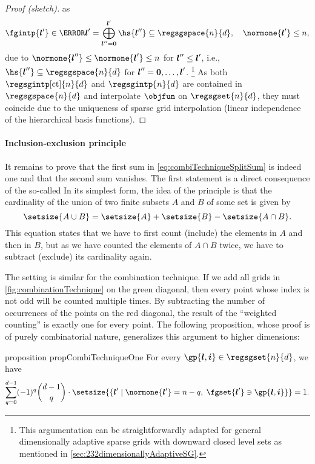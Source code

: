 \begin{proof}[Proof (sketch)]
  as
  \begin{equation}
    \fgintp{\*l'} \in
    \ns{\*l'}
    = \bigoplus_{\*l''=\*0}^{\*l'} \hs{\*l''}
    \subset \regsgspace{n}{d},\quad
    \normone{\*l'} \le n,
  \end{equation}
  due to $\normone{\*l''} \le \normone{\*l'} \le n$
  for ${\boldsymbol{l}}'' \le {\boldsymbol{l}}'$, i.e.,
  $\hs{\*l''} \subset \regsgspace{n}{d}$ for
  ${\boldsymbol{l}}'' = {\boldsymbol{0}}, \dotsc, {\boldsymbol{l}}'$.%
  \footnote{%
    This argumentation can be straightforwardly adapted
    for general dimensionally adaptive sparse grids
    with downward closed level sets as mentioned in
    \cref{sec:232dimensionallyAdaptiveSG}.%
  }
  As both $\regsgintp[\ct]{n}{d}$ and $\regsgintp{n}{d}$
  are contained in $\regsgspace{n}{d}$ and
  interpolate $\objfun$ on $\regsgset{n}{d}$, they must coincide
  due to the uniqueness of sparse grid interpolation
  (linear independence of the hierarchical basis functions).
\end{proof}

\paragraph{Inclusion-exclusion principle}

It remains to prove that the first sum in \eqref{eq:combiTechniqueSplitSum}
is indeed one and that the second sum vanishes.
The first statement is a direct consequence of the so-called
In its simplest form, the idea of the principle is that the cardinality
of the union of two finite subsets $A$ and $B$ of some set is given by
\begin{equation}
  \setsize{A \cup B}
  = \setsize{A} + \setsize{B} - \setsize{A \cap B}.
\end{equation}
This equation states that we have to first count (include)
the elements in $A$ and then in $B$,
but as we have counted the elements of $A \cap B$ twice,
we have to subtract (exclude) its cardinality again.

The setting is similar for the combination technique.
If we add all grids in \cref{fig:combinationTechnique}
on the green diagonal, then every point whose index is not odd
will be counted multiple times.
By subtracting the number of occurrences of the points on the
red diagonal,
the result of the ``weighted counting'' is exactly one for every point.
The following proposition, whose proof is of purely combinatorial nature,
generalizes this argument to higher dimensions:

\begin{restatable}{%
  proposition%
}{%
  propCombiTechniqueOne%
}
  \label{prop:combiTechniqueOne}
  For every $\gp{\*l,\*i} \in \regsgset{n}{d}$, we have
  \begin{equation}
    \label{eq:combiTechniqueOne}
    \sum_{q=0}^{d-1} (-1)^q \binom{d-1}{q} \cdot
    \setsize{
      \{\*l' \mid \normone{\*l'} = n - q,\; \fgset{\*l'} \ni \gp{\*l,\*i}\}
    }
    = 1.
  \end{equation}
\end{restatable}

